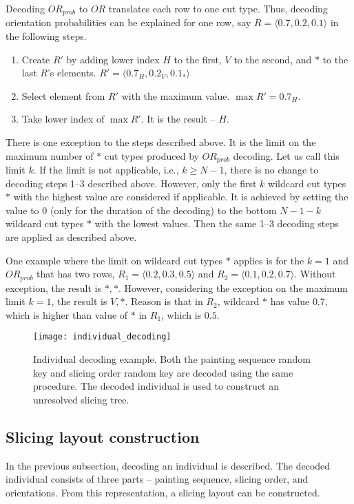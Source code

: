 Decoding $OR_{prob}$ to $OR$ translates each row to one cut type.
Thus, decoding orientation probabilities can be explained for one row, say $R = \langle 0.7, 0.2, 0.1 \rangle$
in the following steps.


\begin{enumerate}
    \item Create $R'$ by adding lower index $H$ to the first, $V$ to the second, and $*$ to the last $R$'s elements.
    $R' = \langle 0.7_H, 0.2_V, 0.1_* \rangle$
    \item Select element from $R'$ with the maximum value. $\max R' = 0.7_H$.
    \item Take lower index of $\max R'$.
    It is the result – $H$.
\end{enumerate}

There is one exception to the steps described above.
It is the limit on the maximum number of $*$ cut types produced by $OR_{prob}$ decoding.
Let us call this limit $k$.
If the limit is not applicable, i.e., $k \geq N-1$, there is no change to decoding steps 1--3 described above.
However, only the first $k$ wildcard cut types $*$ with the highest value are considered if applicable.
It is achieved by setting the value to $0$ (only for the duration of the decoding) to the bottom $N-1-k$ wildcard cut types $*$ with the lowest values.
Then the same 1--3 decoding steps are applied as described above.

One example where the limit on wildcard cut types $*$ applies is for the $k=1$ and $OR_{prob}$ that has two rows, $R_1 = \langle 0.2, 0.3, 0.5 \rangle$ and $R_2 = \langle 0.1, 0.2, 0.7 \rangle$.
Without exception, the result is $*, *$.
However, considering the exception on the maximum limit $k=1$, the result is $V, *$.
Reason is that in $R_2$, wildcard $*$ has value $0.7$,
which is higher than value of $*$ in $R_1$, which is $0.5$.

\begin{figure}[h!]
    \texttt{[image: individual\_decoding]}
    \caption[Individual decoding example]{
        Individual decoding example. Both the painting sequence random key and slicing order random key
        are decoded using the same procedure.
        The decoded individual is used to construct an unresolved slicing tree. }
    \label{fig:individual-decoding}
\end{figure}

\subsection{Slicing layout construction}\label{subsec:slicing-tree-construction}
In the previous subsection, decoding an individual is described.
The decoded individual consists of three parts – painting sequence, slicing order, and orientations.
From this representation, a slicing layout can be constructed.\\


